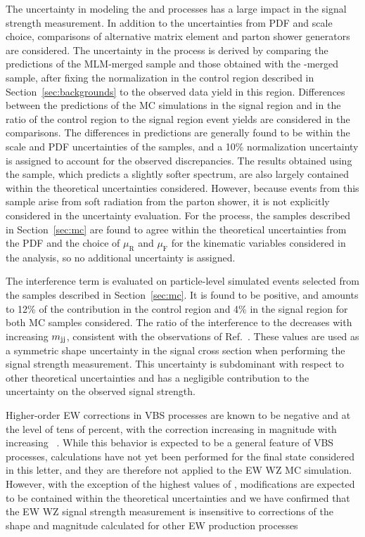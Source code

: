 The uncertainty in modeling the \EWWZ and \QCDWZ
processes has a large impact in the \EWWZ signal strength measurement.
In addition to the uncertainties from PDF and scale choice, 
comparisons of alternative matrix element and parton shower generators are
considered.
The uncertainty in the \QCDWZ process is derived by
comparing the predictions of the MLM-merged sample and those obtained with the \FxFx-merged sample,
after fixing the normalization in the control region described in Section~\ref{sec:backgrounds}
to the observed data yield in this region.
Differences between the predictions of the MC simulations
in the signal region and in the ratio
of the control region to the signal region event yields
are considered in the comparisons.
The differences in predictions are generally found to be
within the scale and PDF uncertainties of the samples,
and a 10\% normalization uncertainty is assigned to account for
the observed discrepancies.
The results obtained using the \POWHEG sample,
which predicts a slightly softer {\mjj} spectrum, are also largely contained 
within the theoretical uncertainties considered.
However, because \WZjj events from this sample arise from
soft radiation from the parton shower, it is 
not explicitly considered in the uncertainty evaluation.
For the \EWWZ process, the samples described in Section~\ref{sec:mc}
are found to agree within
the theoretical uncertainties from the PDF and the choice of 
$\mu_{\mathrm{R}}$ and $\mu_{\mathrm{F}}$ 
for the kinematic variables considered in the analysis,
so no additional uncertainty is
assigned. 


The interference term is evaluated on particle-level simulated events
selected from the samples described in Section~\ref{sec:mc}. 
It is found to be positive, and amounts to 12\% 
of the \EWWZ contribution in the control region and 4\% in the signal region
for both MC samples considered. 
The ratio of the interference to the \EWWZ 
decreases with increasing $m_{\mathrm{jj}}$, consistent with the observations of Ref.~\cite{leshouches2017}.
These values are used as a symmetric shape uncertainty in the 
signal cross section when performing the 
\EWWZ signal strength measurement.
This uncertainty is subdominant with respect to other theoretical uncertainties 
and has a negligible contribution to the uncertainty 
on the observed \EWWZ signal strength.

Higher-order EW corrections in VBS processes are known to be negative and at
the level of tens of percent, with the correction increasing in magnitude 
with increasing {\mjj}~\cite{Biedermann:2016yds}.
While this behavior is expected to be a general feature of VBS processes, 
calculations have not yet been performed for the final state considered 
in this letter, and they are therefore not applied to the EW WZ MC simulation. 
However, with the exception of the highest values of {\mjj}, modifications 
are expected to be contained within the theoretical uncertainties and 
we have confirmed that the EW WZ signal strength measurement is 
insensitive to corrections of the shape and magnitude calculated for 
other EW production processes

